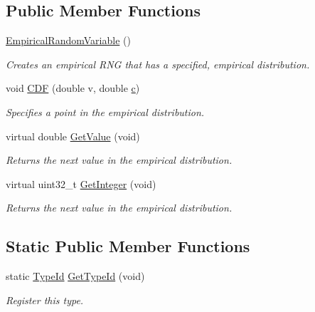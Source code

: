 \subsection*{Public Member Functions}
\begin{DoxyCompactItemize}
\item 
\hyperlink{classns3_1_1EmpiricalRandomVariable_aaaf3433d97766c310c556a0b7aedd226}{Empirical\+Random\+Variable} ()
\begin{DoxyCompactList}\small\item\em Creates an empirical R\+NG that has a specified, empirical distribution. \end{DoxyCompactList}\item 
void \hyperlink{classns3_1_1EmpiricalRandomVariable_a1f85096a98576ebe48417698f191805d}{C\+DF} (double v, double \hyperlink{mmwave_2model_2fading-traces_2fading__trace__generator_8m_ae0323a9039add2978bf5b49550572c7c}{c})
\begin{DoxyCompactList}\small\item\em Specifies a point in the empirical distribution. \end{DoxyCompactList}\item 
virtual double \hyperlink{classns3_1_1EmpiricalRandomVariable_a1a2d5b20db4509d1518727eb725672f7}{Get\+Value} (void)
\begin{DoxyCompactList}\small\item\em Returns the next value in the empirical distribution. \end{DoxyCompactList}\item 
virtual uint32\+\_\+t \hyperlink{classns3_1_1EmpiricalRandomVariable_a4612a2e68540ffa6393d418f8edccbf3}{Get\+Integer} (void)
\begin{DoxyCompactList}\small\item\em Returns the next value in the empirical distribution. \end{DoxyCompactList}\end{DoxyCompactItemize}
\subsection*{Static Public Member Functions}
\begin{DoxyCompactItemize}
\item 
static \hyperlink{classns3_1_1TypeId}{Type\+Id} \hyperlink{classns3_1_1EmpiricalRandomVariable_a7a93b59104ee4825114eb27d95225b09}{Get\+Type\+Id} (void)
\begin{DoxyCompactList}\small\item\em Register this type. \end{DoxyCompactList}\end{DoxyCompactItemize}
